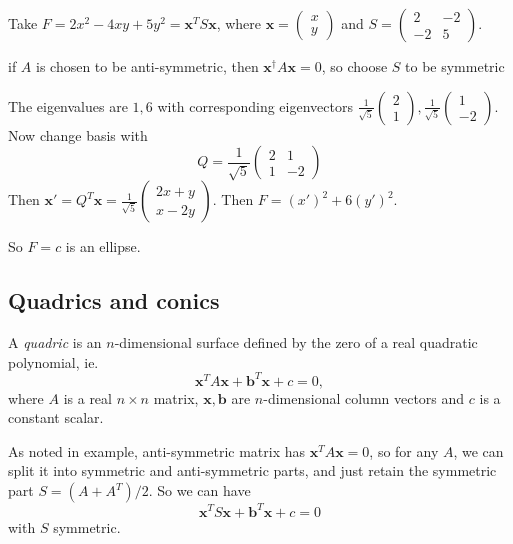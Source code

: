\documentclass[a4paper]{article}
\begin{document}
\begin{eg}
  Take $F = 2x^2 - 4xy + 5y^2 = \mathbf{x}^TS\mathbf{x}$, where $\mathbf{x} = 
  \begin{pmatrix}
    x\\y
  \end{pmatrix}$ and $S = 
  \begin{pmatrix}
    2 & -2\\
    -2 & 5
  \end{pmatrix}$.

  \note if $A$ is chosen to be anti-symmetric, then $\mathbf{x}^\dagger A\mathbf{x} = 0$, so choose $S$ to be symmetric

  The eigenvalues are $1, 6$ with corresponding eigenvectors $
  \displaystyle \frac{1}{\sqrt{5}}\begin{pmatrix}
    2\\1
  \end{pmatrix},\frac{1}{\sqrt{5}}
  \begin{pmatrix}
    1\\-2
  \end{pmatrix}$. Now change basis with
  \[
    Q = \frac{1}{\sqrt{5}}
    \begin{pmatrix}
      2 & 1\\
      1 & -2
    \end{pmatrix}
  \]
  Then $\mathbf{x}' = Q^T\mathbf{x} =
  \frac{1}{\sqrt{5}}\begin{pmatrix}
    2x + y\\x - 2y
  \end{pmatrix}$. Then $F = (x')^2 + 6(y')^2$.

  So $F = c$ is an ellipse.
\end{eg}

\subsection{Quadrics and conics}

\begin{defi}[Quadric]
  A \emph{quadric} is an $n$-dimensional surface defined by the zero of a real quadratic polynomial, ie.
  \[
    \mathbf{x}^T A\mathbf{x} + \mathbf{b}^T\mathbf{x} + c = 0,
  \]
  where $A$ is a real $n\times n$ matrix, $\mathbf{x}, \mathbf{b}$ are $n$-dimensional column vectors and $c$ is a constant scalar.
\end{defi}

As noted in example, anti-symmetric matrix has $\mathbf{x}^TA\mathbf{x} = 0$, so for any $A$, we can split it into symmetric and anti-symmetric parts, and just retain the symmetric part $S = (A + A^T)/2$. So we can have
\[
  \mathbf{x}^T S\mathbf{x} + \mathbf{b}^T\mathbf{x} + c = 0
\]
with $S$ symmetric.
\end{document}
